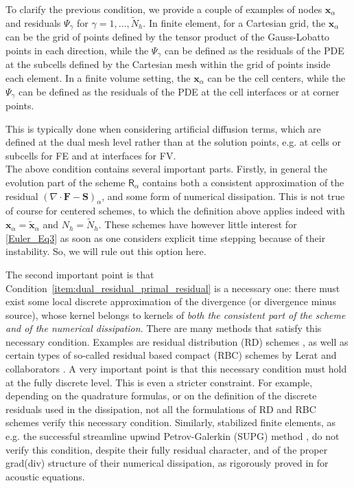 \documentclass[a4paper,10pt]{article}
\begin{document}
To clarify the previous condition, we provide a couple of examples of nodes $\mathbf{x}_\alpha$ and residuals $\Psi_\gamma$ for $\gamma =1,\dots, \tilde{N}_h$. 
In finite element, for a Cartesian grid, the $\mathbf{x}_\alpha$ can be the grid of points defined by the tensor product of the Gauss-Lobatto points in each direction, while the $\Psi_\gamma$ can be defined as the residuals of the PDE at the subcells defined by the Cartesian mesh within the grid of points inside each element.
In a finite volume setting, the $\mathbf{x}_\alpha$ can be the cell centers, while the $\Psi_\gamma$ can be defined as the residuals of the PDE at the cell interfaces or at corner points.

This is typically done when considering artificial diffusion terms, which are defined at the dual mesh level rather than at the solution points, e.g. at cells or subcells for FE and at interfaces for FV.\\


The above condition contains several important parts. Firstly, in general the evolution part of the scheme $\mathsf{R}_\alpha$ contains both a consistent approximation
of the residual $ (\nabla\cdot  \mathbf{F}  - \mathbf{S})_{\alpha}$, and some form of numerical dissipation. 
This is not true of course for centered schemes, to  which
the definition  above applies indeed with $\mathbf x_\alpha =\tilde{\mathbf x}_\alpha$ and $N_h=\tilde{N}_h$.  These schemes have however little interest for \eqref{Euler_Eq3} as soon as one considers explicit time stepping because of their instability.
So, we will rule out this option here. 

The second important point is that Condition~\ref{item:dual_residual_primal_residual} is a necessary one: there must exist some local discrete approximation
of the divergence (or divergence minus source), whose kernel belongs to kernels of \emph{both the consistent part of the scheme and of the numerical dissipation}. 
There are many methods that satisfy this necessary condition. Examples are  residual distribution (RD) schemes \cite{Abgrall2022,RD-ency,AR:17},
as well as certain types of so-called residual based compact  (RBC) schemes by Lerat and collaborators \cite{lerat,lerat2,Corre20071567,LERAT201231}. 
A very important point is that this necessary condition must hold at the fully discrete level.  This is even a stricter constraint.
For example, depending on the quadrature formulas, or on the definition of the discrete residuals used in the dissipation, 
not all  the formulations of RD and RBC schemes  verify this necessary condition. Similarly,  
stabilized finite elements, as e.g. the successful streamline upwind Petrov-Galerkin (SUPG)  method \cite{brooks82,hughes86,HuS:10}, do not verify this condition,
despite their fully residual character, and of the proper grad(div) structure of their numerical dissipation, 
as rigorously proved in \cite{barsukow2025structure} for acoustic equations.
\end{document}
